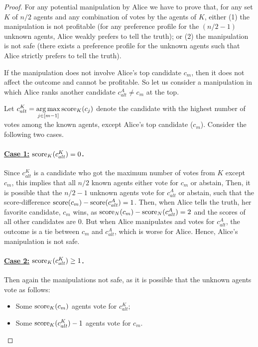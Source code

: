 \begin{proof}
For any potential manipulation by Alice
we have to prove that, 
for any set $K$ of $n/2$ agents and any combination of votes by the agents of $K$, 
either (1) the manipulation is not profitable 
(for any preference profile for the $(n/2-1)$ unknown agents, Alice weakly prefers to tell the truth); or (2) the manipulation is not safe (there exists a preference profile for the unknown agents such that Alice strictly prefers to tell the truth).

\newcommand{\aFav}{c_m}
\newcommand{\aAlt}{c^A_{alt}}
\newcommand{\kAlt}{c^K_{alt}}

If the manipulation does not involve Alice's top candidate $c_m$, then it does not affect the outcome and cannot be profitable. So let us consider a manipulation in which Alice ranks another candidate $\aAlt\neq c_m$ at the top.

Let $\displaystyle \kAlt = \argmax_{j \in [m-1]} \score_K(c_j)$ denote the candidate with the highest number of votes among the known agents, except Alice's top candidate ($c_m$).
Consider the following two cases.

\paragraph{\underline{Case 1:} $\score_K(\kAlt) = 0$.} Since $\kAlt$ is a candidate who got the maximum number of votes from $K$ except $\aFav$, this implies that all $n/2$ known agents either vote for $\aFav$ or abstain,
Then, it is possible that the $n/2-1$ unknown agents vote for $\aAlt$ or abstain, such that the score-difference $\score(c_m)-\score(\aAlt) = 1$.
Then, when Alice tells the truth, her favorite candidate, $\aFav$ wins, as $\score_N(c_m) -\score_N(\aAlt) = 2$ and the scores of all other candidates are $0$. 
But when Alice manipulates and votes for $\aAlt$, the outcome is a tie between $\aFav$ and $\aAlt$, which is worse for Alice.
Hence, Alice's manipulation is not safe.


\paragraph{\underline{Case 2:} $\score_K(\kAlt) \geq 1$.}
Then again the manipulations not safe, as it is possible that the unknown agents vote as follows: 
\begin{itemize}
\item Some $\score_K(\aFav)$ agents vote for $\kAlt$;
\item Some 
$\score_K(\kAlt) -1$ agents vote for $c_m$. 


\end{itemize}
\end{proof}
